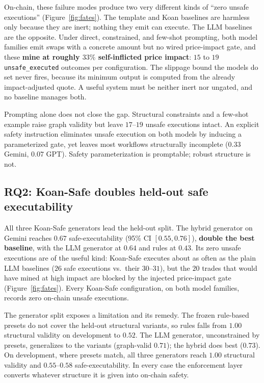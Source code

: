 On-chain, these failure modes produce two very different kinds of
``zero unsafe executions'' (Figure~\ref{fig:fates}). The
template and Koan baselines are harmless only because they are inert;
nothing they emit can execute. The LLM baselines are the opposite. Under
direct, constrained, and few-shot prompting, both model families emit
swaps with a concrete amount but no wired price-impact gate, and these
\textbf{mine at roughly $33\%$ self-inflicted price impact}: $15$ to
$19$ \texttt{unsafe\_executed} outcomes per configuration. The slippage
bound the models do set never fires, because its minimum output is
computed from the already impact-adjusted quote. A useful system must be
neither inert nor ungated, and no baseline manages both.

Prompting alone does not close the gap. Structural constraints and a
few-shot example raise graph validity but leave $17$--$19$ unsafe
executions intact. An explicit safety instruction eliminates unsafe
execution on both models by inducing a parameterized gate, yet leaves
most workflows structurally incomplete ($0.33$ Gemini, $0.07$ GPT).
Safety parameterization is promptable; robust structure is not.

\subsection{RQ2: Koan-Safe doubles held-out safe executability}
\label{sec:rq2}

All three Koan-Safe generators lead the held-out split. The hybrid
generator on Gemini reaches $0.67$ safe-executability (95\% CI
$[0.55,0.76]$), \textbf{double the best baseline}, with the LLM generator
at $0.64$ and rules at $0.43$. Its zero unsafe executions are of the
useful kind: Koan-Safe executes about as often as the plain LLM baselines
($26$ safe executions vs.\ their $30$--$31$), but the $20$ trades that
would have mined at high impact are blocked by the injected price-impact
gate (Figure~\ref{fig:fates}). Every Koan-Safe configuration, on both
model families, records zero on-chain unsafe executions.

The generator split exposes a limitation and its remedy. The frozen
rule-based presets do not cover the held-out structural variants, so
rules falls from $1.00$ structural validity on development to $0.52$.
The LLM generator, unconstrained by presets, generalizes to the variants
(graph-valid $0.71$); the hybrid does best ($0.73$). On development,
where presets match, all three generators reach $1.00$ structural
validity and $0.55$--$0.58$ safe-executability. In every case the
enforcement layer converts whatever structure it is given into on-chain
safety.

